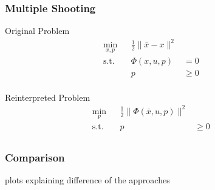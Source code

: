 \begin{frame}
    \frametitle{Multiple Shooting}

    Original Problem
    \begin{align*}
        \min_{x,p} & & \frac{1}{2} \| \bar{x} - x \|^2 & & \\
        \operatorname{s.t.} & & \Phi(x,u,p) & = 0 & & \\
                            & & p & \geq 0 & & \\
    \end{align*}

    Reinterpreted Problem
    \begin{align*}
        \min_{p}  & & \frac{1}{2} \| \Phi(\bar{x},u,p) \|^2 & & \\
        \operatorname{s.t.} & & p & \geq 0 & & \\
    \end{align*}
\end{frame}

\begin{frame}
    \frametitle{Comparison}

    plots explaining difference of the approaches
\end{frame}


